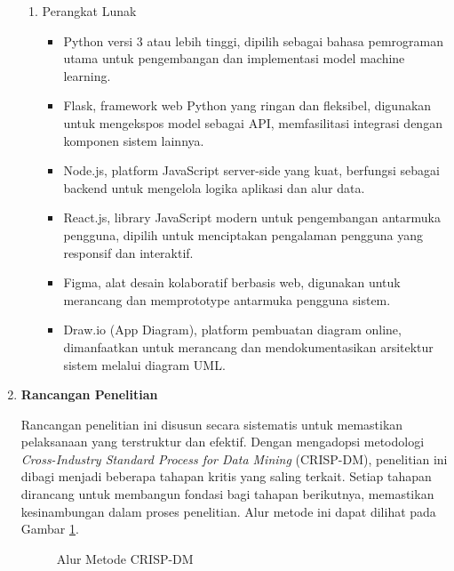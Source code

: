 \begin{enumerate}
\begin{enumerate}
        \item Perangkat Lunak
        \begin{itemize}
            \item Python versi 3 atau lebih tinggi, dipilih sebagai bahasa pemrograman utama untuk pengembangan dan implementasi model machine learning.
            \item Flask, framework web Python yang ringan dan fleksibel, digunakan untuk mengekspos model sebagai API, memfasilitasi integrasi dengan komponen sistem lainnya.
            \item Node.js, platform JavaScript server-side yang kuat, berfungsi sebagai backend untuk mengelola logika aplikasi dan alur data.
            \item React.js, library JavaScript modern untuk pengembangan antarmuka pengguna, dipilih untuk menciptakan pengalaman pengguna yang responsif dan interaktif.
            \item Figma, alat desain kolaboratif berbasis web, digunakan untuk merancang dan memprototype antarmuka pengguna sistem.
            \item Draw.io (App Diagram), platform pembuatan diagram online, dimanfaatkan untuk merancang dan mendokumentasikan arsitektur sistem melalui diagram UML.
        \end{itemize}
    \end{enumerate}

    \item \textbf{Rancangan Penelitian}
    
    Rancangan penelitian ini disusun secara sistematis untuk memastikan pelaksanaan yang terstruktur dan efektif. Dengan mengadopsi metodologi \textit{Cross-Industry Standard Process for Data Mining} (CRISP-DM), penelitian ini dibagi menjadi beberapa tahapan kritis yang saling terkait. Setiap tahapan dirancang untuk membangun fondasi bagi tahapan berikutnya, memastikan kesinambungan dalam proses penelitian. Alur metode ini dapat dilihat pada Gambar \ref{fig:crisp-dm-overview}.

    \begin{figure}[H]
        \centering
        \caption{Alur Metode CRISP-DM \cite{IBM2022}}
        \label{fig:crisp-dm-overview}
    \end{figure}


\end{enumerate}

